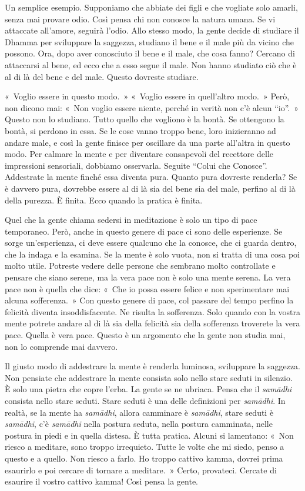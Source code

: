 Un semplice esempio. Supponiamo che abbiate dei figli e che vogliate
solo amarli, senza mai provare odio. Così pensa chi non conosce la
natura umana. Se vi attaccate all'amore, seguirà l'odio. Allo stesso
modo, la gente decide di studiare il Dhamma per sviluppare la saggezza,
studiano il bene e il male più da vicino che possono. Ora, dopo aver
conosciuto il bene e il male, che cosa fanno? Cercano di attaccarsi al
bene, ed ecco che a esso segue il male. Non hanno studiato ciò che è al
di là del bene e del male. Questo dovreste studiare.

«~Voglio essere in questo modo.~» «~Voglio essere in quell'altro modo.~»
Però, non dicono mai: «~Non voglio essere niente, perché in verità non
c'è alcun ``io''.~» Questo non lo studiano. Tutto quello che vogliono è
la bontà. Se ottengono la bontà, si perdono in essa. Se le cose vanno
troppo bene, loro inizieranno ad andare male, e così la gente finisce
per oscillare da una parte all'altra in questo modo. Per calmare la
mente e per diventare consapevoli del recettore delle impressioni
sensoriali, dobbiamo osservarla. Seguite ``Colui che Conosce''.
Addestrate la mente finché essa diventa pura. Quanto pura dovreste
renderla? Se è davvero pura, dovrebbe essere al di là sia del bene sia
del male, perfino al di là della purezza. È finita. Ecco quando la
pratica è finita.

Quel che la gente chiama sedersi in meditazione è solo un tipo di pace
temporaneo. Però, anche in questo genere di pace ci sono delle
esperienze. Se sorge un'esperienza, ci deve essere qualcuno che la
conosce, che ci guarda dentro, che la indaga e la esamina. Se la mente è
solo vuota, non si tratta di una cosa poi molto utile. Potreste vedere
delle persone che sembrano molto controllate e pensare che siano serene,
ma la vera pace non è solo una mente serena. La vera pace non è quella
che dice: «~Che io possa essere felice e non sperimentare mai alcuna
sofferenza.~» Con questo genere di pace, col passare del tempo perfino
la felicità diventa insoddisfacente. Ne risulta la sofferenza. Solo
quando con la vostra mente potrete andare al di là sia della felicità
sia della sofferenza troverete la vera pace. Quella è vera pace. Questo
è un argomento che la gente non studia mai, non lo comprende mai
davvero.

Il giusto modo di addestrare la mente è renderla luminosa, sviluppare la
saggezza. Non pensiate che addestrare la mente consista solo nello stare
seduti in silenzio. È solo una pietra che copre l'erba. La gente se ne
ubriaca. Pensa che il \emph{samādhi} consista nello stare seduti. Stare
seduti è una delle definizioni per \emph{samādhi}. In realtà, se la
mente ha \emph{samādhi}, allora camminare è \emph{samādhi}, stare seduti
è \emph{samādhi}, c'è \emph{samādhi} nella postura seduta, nella postura
camminata, nelle postura in piedi e in quella distesa. È tutta pratica.
Alcuni si lamentano: «~Non riesco a meditare, sono troppo irrequieto.
Tutte le volte che mi siedo, penso a questo e a quello. Non riesco a
farlo. Ho troppo cattivo kamma, dovrei prima esaurirlo e poi
cercare di tornare a meditare.~» Certo, provateci. Cercate di esaurire
il vostro cattivo kamma! Così pensa la gente.

